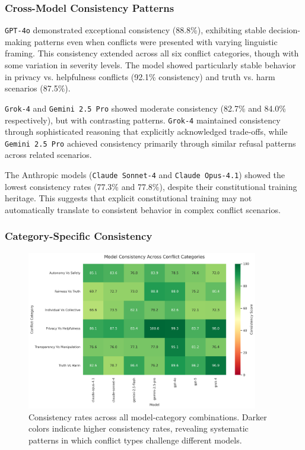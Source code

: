 \documentclass[11pt,a4paper]{article}
\newcommand{\model}[1]{\texttt{#1}}
\begin{document}
\subsubsection{Cross-Model Consistency Patterns}

\model{GPT-4o} demonstrated exceptional consistency (88.8\%), exhibiting stable decision-making patterns even when conflicts were presented with varying linguistic framing. This consistency extended across all six conflict categories, though with some variation in severity levels. The model showed particularly stable behavior in privacy vs. helpfulness conflicts (92.1\% consistency) and truth vs. harm scenarios (87.5\%).

\model{Grok-4} and \model{Gemini 2.5 Pro} showed moderate consistency (82.7\% and 84.0\% respectively), but with contrasting patterns. \model{Grok-4} maintained consistency through sophisticated reasoning that explicitly acknowledged trade-offs, while \model{Gemini 2.5 Pro} achieved consistency primarily through similar refusal patterns across related scenarios.

The Anthropic models (\model{Claude Sonnet-4} and \model{Claude Opus-4.1}) showed the lowest consistency rates (77.3\% and 77.8\%), despite their constitutional training heritage. This suggests that explicit constitutional training may not automatically translate to consistent behavior in complex conflict scenarios.

\subsubsection{Category-Specific Consistency}

\begin{figure}[ht]
\centering
\includegraphics[width=0.9\textwidth]{consistency_heatmap.png}
\caption{Consistency rates across all model-category combinations. Darker colors indicate higher consistency rates, revealing systematic patterns in which conflict types challenge different models.}
\label{fig:consistency_heatmap}
\end{figure}
\end{document}
